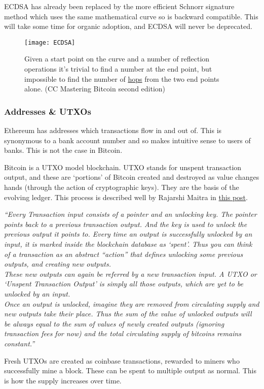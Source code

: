 ECDSA has already been replaced by the more efficient Schnorr signature method \cite{schnorr1989efficient} which uses the same mathematical curve so is backward compatible. This will take some time for organic adoption, and ECDSA will never be deprecated.\par
\begin{figure}
  \centering
    \texttt{[image: ECDSA]}
  \caption{Given a start point on the curve and a number of reflection operations it's trivial to find a number at the end point, but impossible to find the number of \href{https://github.com/bitcoinbook/bitcoinbook/blob/develop/ch04.asciidoc}{hops} from the two end points alone. (CC Mastering Bitcoin second edition)}
  \label{fig:ECDSA}
\end{figure}
\subsubsection{Addresses \& UTXOs}
Ethereum has addresses which transactions flow in and out of. This is synonymous to a bank account number and so makes intuitive sense to users of banks. This is not the case in Bitcoin.\par
Bitcoin is a UTXO model blockchain. UTXO stands for unspent transaction output, and these are `portions' of Bitcoin created and destroyed as value changes hands (through the action of cryptographic keys). They are the basis of the evolving ledger. This process is described well by Rajarshi Maitra in \href{https://medium.com/bitbees/what-the-heck-is-utxo-ca68f2651819}{this post}.\par
\textit{``Every Transaction input consists of a pointer and an unlocking key. The pointer points back to a previous transaction output. And the key is used to unlock the previous output it points to. Every time an output is successfully unlocked by an input, it is marked inside the blockchain database as `spent'. Thus you can think of a transaction as an abstract “action” that defines unlocking some previous outputs, and creating new outputs.\\
These new outputs can again be referred by a new transaction input. A UTXO or `Unspent Transaction Output' is simply all those outputs, which are yet to be unlocked by an input.\\
Once an output is unlocked, imagine they are removed from circulating supply and new outputs take their place. Thus the sum of the value of unlocked outputs will be always equal to the sum of values of newly created outputs (ignoring transaction fees for now) and the total circulating supply of bitcoins remains constant.''}\par
Fresh UTXOs are created as coinbase transactions, rewarded to miners who successfully mine a block. These can be spent to multiple output as normal. This is how the supply increases over time.
